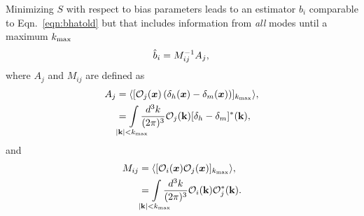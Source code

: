 \documentclass[fleqn,usenatbib]{mnras}
\newcommand{\bx}{\boldsymbol x}
\newcommand{\bk}{\textbf{k}}
\begin{document}
Minimizing $S$ with respect to bias parameters leads to an estimator $\hat{b}_i$ comparable to Eqn.~\ref{eqn:bhatold} but that includes information from \emph{all} modes until a maximum $k_{\rm max}$
\begin{equation}
\label{eqn:bhat}
    \hat{b}_i = M^{-1}_{ij} A_j, \\
\end{equation}
where $A_j$ and $M_{ij}$ are defined as 
\begin{align}
\label{eqn:aj}
    A_j &= \langle [\mathcal{O}_j(\bx)\left (\delta_h (\bx) - \delta_m (\bx) \right)]_{k_{\rm max}}\rangle, \\
     &= \int\limits_{\mathclap{|\bk| < k_{\rm max}}} \frac{d^3k}{(2\pi)^3} \mathcal{O}_j (\bk) [\delta_h - \delta_m]^*(\bk), 
\end{align}
and
\begin{align}
\label{eqn:mij}
    M_{ij} &= \langle [\mathcal{O}_i (\bx) \mathcal{O}_j (\bx)]_{k_{\rm max}} \rangle,\\
    &=\int \limits_{\mathclap{|\bk| < k_{\rm max}}}\frac{d^3k}{(2\pi)^3} \mathcal{O}_i (\bk) \mathcal{O}_j^*(\bk).
\end{align}
\end{document}
